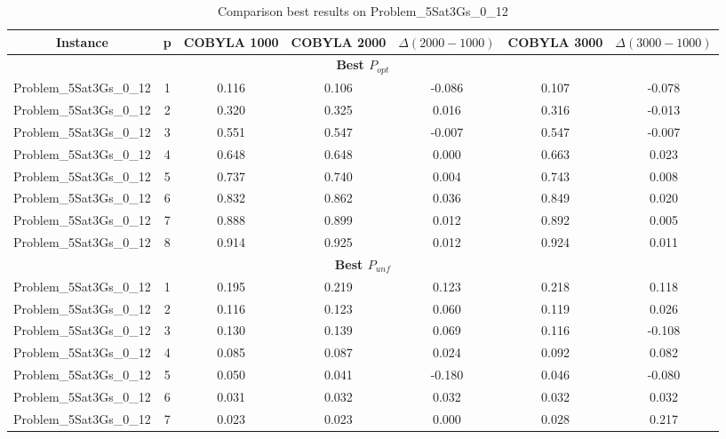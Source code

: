 \begin{table}[!htbp]
    \renewcommand{\arraystretch}{0.7}
    \scriptsize
    \centering
    \caption{Comparison best results on Problem\_5Sat3Gs\_0\_12}
    \begin{adjustbox}{max width=\columnwidth}
        \begin{tabularx}{\columnwidth}{c|c c c c c c}
            \toprule
            \textbf{Instance} & \textbf{p} & \textbf{COBYLA 1000} & \textbf{COBYLA 2000} & $\Delta(2000-1000)$ & \textbf{COBYLA 3000} & $\Delta(3000-1000)$ \\
            \midrule
            \multicolumn{7}{c}{\textbf{Best $P_{opt}$}} \\ \midrule
            Problem\_5Sat3Gs\_0\_12 & 1 & 0.116 & 0.106 & -0.086 & 0.107 & -0.078 \\
            Problem\_5Sat3Gs\_0\_12 & 2 & 0.320 & 0.325 & 0.016 & 0.316 & -0.013 \\
            Problem\_5Sat3Gs\_0\_12 & 3 & 0.551 & 0.547 & -0.007 & 0.547 & -0.007 \\
            Problem\_5Sat3Gs\_0\_12 & 4 & 0.648 & 0.648 & 0.000 & 0.663 & 0.023 \\
            Problem\_5Sat3Gs\_0\_12 & 5 & 0.737 & 0.740 & 0.004 & 0.743 & 0.008 \\
            Problem\_5Sat3Gs\_0\_12 & 6 & 0.832 & 0.862 & 0.036 & 0.849 & 0.020 \\
            Problem\_5Sat3Gs\_0\_12 & 7 & 0.888 & 0.899 & 0.012 & 0.892 & 0.005 \\
            Problem\_5Sat3Gs\_0\_12 & 8 & 0.914 & 0.925 & 0.012 & 0.924 & 0.011 \\
            \multicolumn{7}{c}{\textbf{Best $P_{unf}$}} \\ \midrule
            Problem\_5Sat3Gs\_0\_12 & 1 & 0.195 & 0.219 & 0.123 & 0.218 & 0.118 \\
            Problem\_5Sat3Gs\_0\_12 & 2 & 0.116 & 0.123 & 0.060 & 0.119 & 0.026 \\
            Problem\_5Sat3Gs\_0\_12 & 3 & 0.130 & 0.139 & 0.069 & 0.116 & -0.108 \\
            Problem\_5Sat3Gs\_0\_12 & 4 & 0.085 & 0.087 & 0.024 & 0.092 & 0.082 \\
            Problem\_5Sat3Gs\_0\_12 & 5 & 0.050 & 0.041 & -0.180 & 0.046 & -0.080 \\
            Problem\_5Sat3Gs\_0\_12 & 6 & 0.031 & 0.032 & 0.032 & 0.032 & 0.032 \\
            Problem\_5Sat3Gs\_0\_12 & 7 & 0.023 & 0.023 & 0.000 & 0.028 & 0.217 \\

\end{tabularx}
\end{adjustbox}
\end{table}
